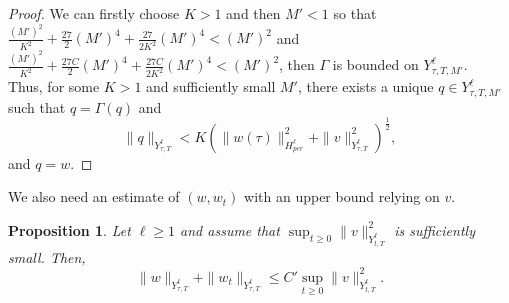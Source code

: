 \documentclass[10pt,a4paper,final]{article}
\numberwithin{equation}{section}
\newtheorem{prop}[theorem]{Proposition}
\begin{document}
\begin{proof}
We can firstly choose $K>1$ and then $M'<1$ so that  $ \frac{(M')^2}{K^2}+\frac{27}{2}(M')^4+\frac{27}{2K^2}(M')^4<(M')^2$ and $\frac{(M')^2}{K^2}+\frac{27C}{2}(M')^4+\frac{27C}{2K^2}(M')^4<(M')^2$, then $\Gamma$ is bounded on $Y^{\ell}_{\tau,T,M'}$.\\


Thus, for some $K>1$ and sufficiently small $M'$, there exists a unique $q\in Y^{\ell}_{\tau,T,M'}$ such that $q=\Gamma(q)$ and $$\|q\|_{Y^{\ell}_{\tau,T}}<K(\|w(\tau)\|_{H^{\ell}_{per}}^2+\|v\|_{Y^{\ell}_{\tau,T}}^2)^{\frac12},$$
 and $q=w$. 
\end{proof}

We also need an estimate of $(w, w_t)$ with an upper bound relying on $v$.

\begin{prop}\label{Prop4}
Let $\ell\geq 1$ and assume that $\sup_{t\geq 0}\|v\|_{Y^{\ell}_{t,T}}^2$ is sufficiently small. Then, 
$$\|w\|_{Y^{\ell}_{\tau,T}}+\|w_t\|_{Y^{\ell}_{\tau,T}}\leq C'\sup_{t\geq 0}\|v\|_{Y^{\ell}_{t,T}}^2.$$
\end{prop}
\end{document}
